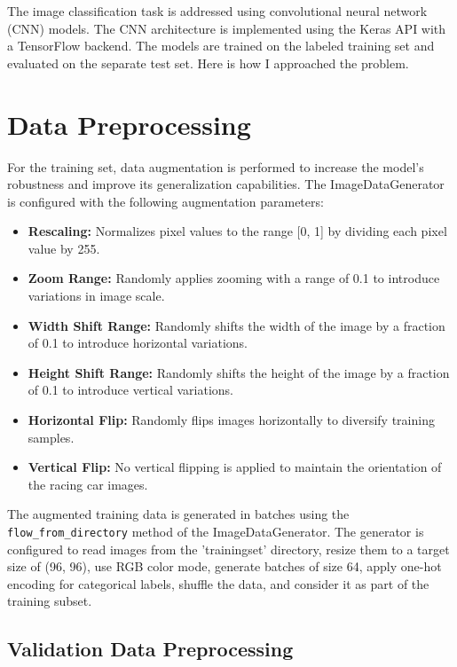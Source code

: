 \documentclass{article}
\begin{document}
The image classification task is addressed using convolutional neural network (CNN) models. The CNN architecture is implemented using the Keras API with a TensorFlow backend. The models are trained on the labeled training set and evaluated on the separate test set.
\newline
\newline
Here is how I approached the problem.

\section{Data Preprocessing}

For the training set, data augmentation is performed to increase the model's robustness and improve its generalization capabilities. The ImageDataGenerator is configured with the following augmentation parameters:

\begin{itemize}
    \item \textbf{Rescaling:} Normalizes pixel values to the range [0, 1] by dividing each pixel value by 255.
    \item \textbf{Zoom Range:} Randomly applies zooming with a range of 0.1 to introduce variations in image scale.
    \item \textbf{Width Shift Range:} Randomly shifts the width of the image by a fraction of 0.1 to introduce horizontal variations.
    \item \textbf{Height Shift Range:} Randomly shifts the height of the image by a fraction of 0.1 to introduce vertical variations.
    \item \textbf{Horizontal Flip:} Randomly flips images horizontally to diversify training samples.
    \item \textbf{Vertical Flip:} No vertical flipping is applied to maintain the orientation of the racing car images.
\end{itemize}

The augmented training data is generated in batches using the \texttt{flow\_from\_directory} method of the ImageDataGenerator. The generator is configured to read images from the 'trainingset' directory, resize them to a target size of (96, 96), use RGB color mode, generate batches of size 64, apply one-hot encoding for categorical labels, shuffle the data, and consider it as part of the training subset.

\subsection{Validation Data Preprocessing}
\end{document}
